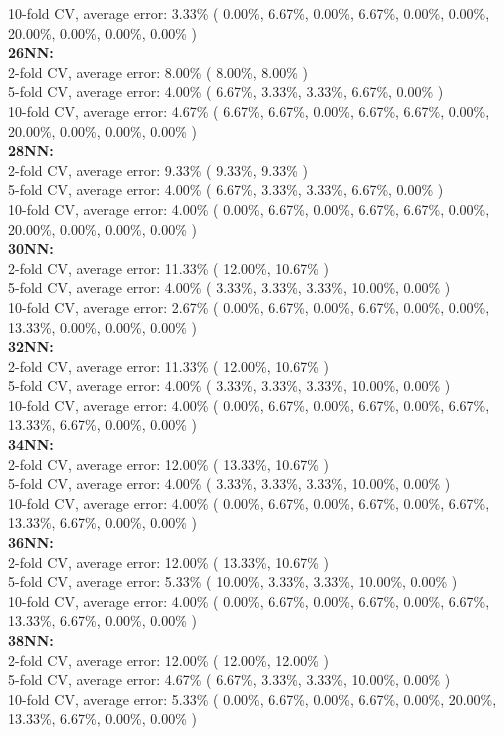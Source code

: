 \documentclass[11pt,a4paper]{article}
\begin{document}
10-fold CV, average error: 3.33\%  ( 0.00\%, 6.67\%, 0.00\%, 6.67\%, 0.00\%, 0.00\%, 20.00\%, 0.00\%, 0.00\%, 0.00\% )\\
\textbf{26NN:} \\
2-fold CV, average error: 8.00\%  ( 8.00\%, 8.00\% )\\
5-fold CV, average error: 4.00\%  ( 6.67\%, 3.33\%, 3.33\%, 6.67\%, 0.00\% )\\
10-fold CV, average error: 4.67\%  ( 6.67\%, 6.67\%, 0.00\%, 6.67\%, 6.67\%, 0.00\%, 20.00\%, 0.00\%, 0.00\%, 0.00\% )\\
\textbf{28NN:} \\
2-fold CV, average error: 9.33\%  ( 9.33\%, 9.33\% )\\
5-fold CV, average error: 4.00\%  ( 6.67\%, 3.33\%, 3.33\%, 6.67\%, 0.00\% )\\
10-fold CV, average error: 4.00\%  ( 0.00\%, 6.67\%, 0.00\%, 6.67\%, 6.67\%, 0.00\%, 20.00\%, 0.00\%, 0.00\%, 0.00\% )\\
\textbf{30NN:} \\
2-fold CV, average error: 11.33\%  ( 12.00\%, 10.67\% )\\
5-fold CV, average error: 4.00\%  ( 3.33\%, 3.33\%, 3.33\%, 10.00\%, 0.00\% )\\
10-fold CV, average error: 2.67\%  ( 0.00\%, 6.67\%, 0.00\%, 6.67\%, 0.00\%, 0.00\%, 13.33\%, 0.00\%, 0.00\%, 0.00\% )\\
\textbf{32NN:} \\
2-fold CV, average error: 11.33\%  ( 12.00\%, 10.67\% )\\
5-fold CV, average error: 4.00\%  ( 3.33\%, 3.33\%, 3.33\%, 10.00\%, 0.00\% )\\
10-fold CV, average error: 4.00\%  ( 0.00\%, 6.67\%, 0.00\%, 6.67\%, 0.00\%, 6.67\%, 13.33\%, 6.67\%, 0.00\%, 0.00\% )\\
\textbf{34NN:} \\
2-fold CV, average error: 12.00\%  ( 13.33\%, 10.67\% )\\
5-fold CV, average error: 4.00\%  ( 3.33\%, 3.33\%, 3.33\%, 10.00\%, 0.00\% )\\
10-fold CV, average error: 4.00\%  ( 0.00\%, 6.67\%, 0.00\%, 6.67\%, 0.00\%, 6.67\%, 13.33\%, 6.67\%, 0.00\%, 0.00\% )\\
\textbf{36NN:} \\
2-fold CV, average error: 12.00\%  ( 13.33\%, 10.67\% )\\
5-fold CV, average error: 5.33\%  ( 10.00\%, 3.33\%, 3.33\%, 10.00\%, 0.00\% )\\
10-fold CV, average error: 4.00\%  ( 0.00\%, 6.67\%, 0.00\%, 6.67\%, 0.00\%, 6.67\%, 13.33\%, 6.67\%, 0.00\%, 0.00\% )\\
\textbf{38NN:} \\
2-fold CV, average error: 12.00\%  ( 12.00\%, 12.00\% )\\
5-fold CV, average error: 4.67\%  ( 6.67\%, 3.33\%, 3.33\%, 10.00\%, 0.00\% )\\
10-fold CV, average error: 5.33\%  ( 0.00\%, 6.67\%, 0.00\%, 6.67\%, 0.00\%, 20.00\%, 13.33\%, 6.67\%, 0.00\%, 0.00\% )\\
\end{document}
